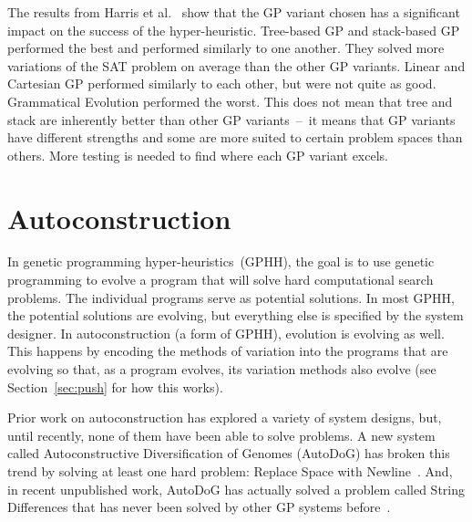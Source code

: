 \documentclass{sig-alternate}
\begin{document}
The results from Harris et al.~\cite{harris:2015} show that the GP variant chosen has a significant impact on the success of the hyper-heuristic. Tree-based GP and stack-based GP performed the best and performed similarly to one another. They solved more variations of the SAT problem on average than the other GP variants. Linear and Cartesian GP performed similarly to each other, but were not quite as good. Grammatical Evolution performed the worst. This does not mean that tree and stack are inherently better than other GP variants~--~it means that GP variants have different strengths and some are more suited to certain problem spaces than others. More testing is needed to find where each GP variant excels.

\section{Autoconstruction}
\label{sec:ac}
In genetic programming hyper-heuristics~(GPHH), the goal is to use genetic programming to evolve a program that will solve hard computational search problems. The individual programs serve as potential solutions. In most GPHH, the potential solutions are evolving, but everything else is specified by the system designer.  In autoconstruction (a form of GPHH), evolution is evolving as well. This happens by encoding the methods of variation into the programs that are evolving so that, as a program evolves, its variation methods also evolve (see Section~\ref{sec:push} for how this works). 

Prior work on autoconstruction has explored a variety of system designs, but, until recently, none of them have been able to solve  problems. A new system called Autoconstructive Diversification of Genomes (AutoDoG) has broken this trend by solving at least one hard problem: Replace Space with Newline~\cite{spector:2016}. And, in recent unpublished work, AutoDoG has actually solved a problem called String Differences that has never been solved by other GP systems before~\cite{eva:2017}.
\end{document}
